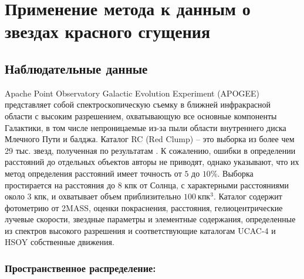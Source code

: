 \documentclass{matmex-diploma-custom}
\begin{document}
\section{Применение метода к данным о звездах красного сгущения}
\subsection{Наблюдательные данные}
Apache Point Observatory Galactic Evolution Experiment (APOGEE) представляет собой спектроскопическую съемку в ближней инфракрасной области с высоким разрешением, охватывающую все основные компоненты Галактики, в том числе непроницаемые из-за пыли области внутреннего диска Млечного Пути и балджа. Каталог RC (Red Clump) \cite{1} \cite{2} -- это выборка из более чем 29 тыс. звезд, полученная по результатам \cite{5}. К сожалению, ошибки в определении расстояний до отдельных объектов авторы не приводят, однако указывают, что их метод определения расстояний имеет точность от $5$ до $10\%$. Выборка простирается на расстояния до 8 кпк от Солнца, с характерными расстояниями около 3 кпк, и охватывает объем приблизительно $100 ~\textrm{кпк}^3$.  Каталог содержит фотометрию от 2MASS, оценки покраснения, расстояния, гелиоцентрические лучевые скорости, звездные параметры и элементные содержания, определенные из спектров высокого разрешения и соответствующие каталогам UCAC-4 и HSOY собственные движения. 

\subsubsection*{Пространственное распределение:}
\end{document}
